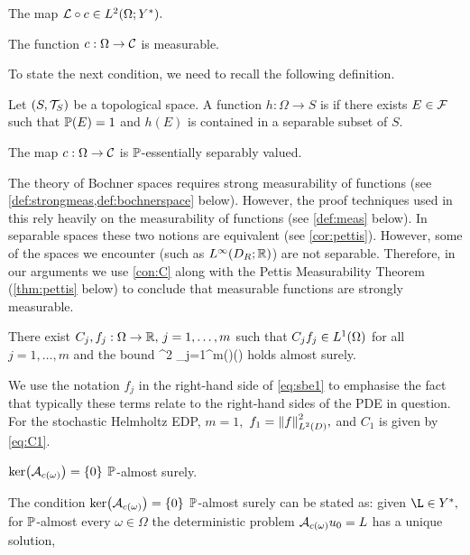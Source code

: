 \label{con:L}
The map $\rhs\circ \coeff \in \LtOYs.$
\econvar

\label{con:cborel}
 The function $c:\Omega \rightarrow \mathcal C$ is measurable.
\econvar

To state the next condition, we need to recall the following definition.

\label{def:sepval}
Let $\mleft(S,\Top{S}\mright)$ be a topological space. A function $h:\Omega\rightarrow S$ is  if there exists $E \in \mathcal F$ such that $\mathbb P(E) = 1$ and $h(E)$ is contained in a separable subset of $S$.
\ede


\label{con:C}
The map $c:\Omega\rightarrow\mathcal C$  is $\mathbb P$-essentially separably valued.
\econvar

The theory of Bochner spaces requires strong measurability of functions (see \cref{def:strongmeas,def:bochnerspace} below). However, the proof techniques used in this  rely heavily on the measurability of functions (see \cref{def:meas} below). In separable spaces these two notions are equivalent (see \cref{cor:pettis}). However, some of the spaces we encounter (such as $\LiDRRR$) are not separable. Therefore, in our arguments we use \cref{con:C} along with the Pettis Measurability Theorem (\cref{thm:pettis} below) to conclude that measurable functions are strongly measurable.
\ere

\label{con:B}
There exist $C_{j},f_{j}:\Omega\rightarrow \mathbb R, \,j=1,\ldots,m$ such that $\Cj\fj \in \LoO$ for all $j=1,\ldots,m$ and the bound
\beq \label{eq:sbe1}
^2 \leq \sum_{j=1}^m\Cj(\omega)\fj(\omega)
\eeq
holds almost surely.
\econvar

We use the notation $f_j$ in the right-hand side of \eqref{eq:sbe1} to emphasise the fact that typically these terms relate to the right-hand sides of the PDE in question. For the stochastic Helmholtz EDP, $m=1,$ $f_1 = \NLtD{f}^2,$ and $C_1$ is given by \eqref{eq:C1}.
\ere


\label{con:K}
$\ker\mleft(\Acomega\mright) = \set{0}$ $\mathbb P$-almost surely.
\econvar

The condition  $\ker\mleft(\Acomega\mright) = \set{0}$ $\mathbb P$-almost surely can be stated as: given $\L \in \Ys,$ for $\mathbb P$-almost every $\omega \in \Omega$ the deterministic problem $\Acomega \uz = L$ has a unique solution,

